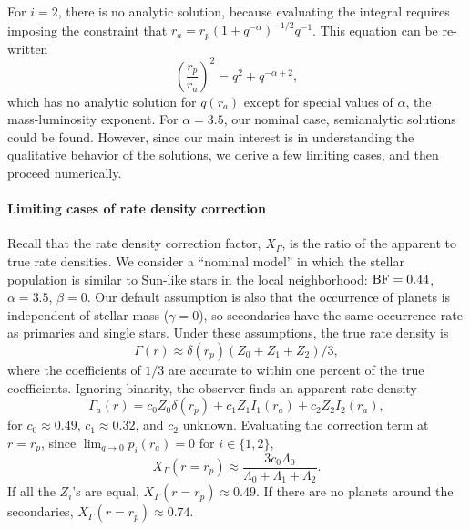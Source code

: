 For $i=2$, there is no analytic solution, because evaluating the integral 
requires imposing the constraint that $r_a  = r_p 
(1+q^{-\alpha})^{-1/2}q^{-1}$. This equation can be re-written
\begin{equation}
\left(\frac{r_p}{r_a}\right)^2 = q^2 + q^{-\alpha + 2},
\end{equation}
which has no analytic solution for $q(r_a)$ except for special values of 
$\alpha$, the mass-luminosity exponent.
For $\alpha=3.5$, our nominal case, semianalytic solutions could be found.
However, since our main interest is in understanding the qualitative behavior 
of the solutions, we derive a few limiting cases, and then proceed 
numerically.


\paragraph{Limiting cases of rate density correction}
Recall that the rate density correction factor, $X_\Gamma$, is the ratio of 
the apparent to true rate densities.
We consider a ``nominal model'' in which the stellar population is similar to 
Sun-like stars in the local neighborhood:
${\rm BF}=0.44$, $\alpha=3.5$, $\beta=0$.
Our default assumption is also that the occurrence of planets is independent 
of stellar mass ($\gamma=0$), so secondaries have the same occurrence rate as 
primaries and single stars.
Under these assumptions, the true rate density is
\begin{equation}
\Gamma(r) \approx \delta(r_p) \left( Z_0 + Z_1 + 
Z_2 \right) / 3,
\label{eq:model2_Gamma_r}
\end{equation}
where the coefficients of $1/3$ are accurate to within one percent of the true 
coefficients.
Ignoring binarity, the observer finds an apparent rate density
\begin{equation}
\Gamma_a(r) = c_0 Z_0 \delta(r_p)
             +c_1 Z_1 I_1(r_a)
             +c_2 Z_2 I_2(r_a),
\label{eq:model2_Gamma_a_r}
\end{equation}
for $c_0\approx 0.49$, $c_1\approx 0.32$, and $c_2$ unknown.
Evaluating the correction term at $r=r_p$, since $\lim_{q\rightarrow0} 
p_i(r_a)=0$ for $i\in\{1,2\}$,
\begin{equation}
X_\Gamma(r=r_p) \approx \frac{3c_0 \Lambda_0}{\Lambda_0+\Lambda_1+\Lambda_2}.
\end{equation}
If all the $Z_i$'s are equal, $X_\Gamma(r=r_p)\approx0.49$.
If there are no planets around the secondaries, $X_\Gamma(r=r_p)\approx0.74$.

